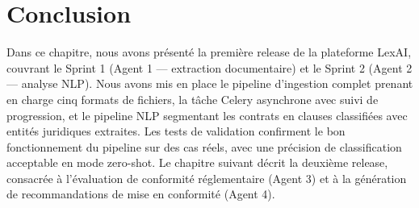 \section{Conclusion}

Dans ce chapitre, nous avons présenté la première release de la plateforme LexAI, couvrant le Sprint 1 (Agent 1 — extraction documentaire) et le Sprint 2 (Agent 2 — analyse NLP). Nous avons mis en place le pipeline d'ingestion complet prenant en charge cinq formats de fichiers, la tâche Celery asynchrone avec suivi de progression, et le pipeline NLP segmentant les contrats en clauses classifiées avec entités juridiques extraites. Les tests de validation confirment le bon fonctionnement du pipeline sur des cas réels, avec une précision de classification acceptable en mode zero-shot. Le chapitre suivant décrit la deuxième release, consacrée à l'évaluation de conformité réglementaire (Agent 3) et à la génération de recommandations de mise en conformité (Agent 4).
